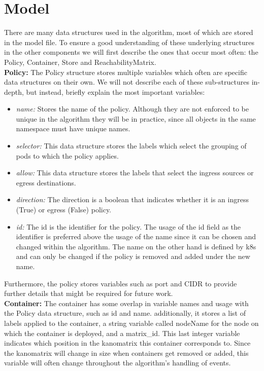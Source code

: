 \section{Model} \label{impl:model} There are many data structures used in the algorithm, most of which are stored in the model file. To ensure a good understanding of these underlying structures in the other components we will first describe the ones that occur most often: the Policy, Container, Store and ReachabilityMatrix.
\\[10pt]

\textbf{Policy:} The Policy structure stores multiple variables which often are specific data structures on their own. We will not describe each of these sub-structures in-depth, but instead, briefly explain the most important variables:
\begin{itemize}
    \renewcommand{\labelitemi}{\scriptsize$\blacksquare$}
    \item \textit{name:} Stores the name of the policy. Although they are not enforced to be unique in the algorithm they will be in practice, since all objects in the same namespace must have unique names. 
    \item \textit{selector:} This data structure stores the labels which select the grouping of pods to which the policy applies.
    \item \textit{allow:} This data structure stores the labels that select the ingress sources or egress destinations.
    \item \textit{direction:} The direction is a boolean that indicates whether it is an ingress (True) or egress (False) policy.
    \item \textit{id:} The id is the identifier for the policy. The usage of the id field as the identifier is preferred above the usage of the name since it can be chosen and changed within the algorithm. The name on the other hand is defined by \acrshort{k8s} and can only be changed if the policy is removed and added under the new name.
\end{itemize}
Furthermore, the policy stores variables such as port and CIDR to provide further details that might be required for future work.
\\[10pt]

\textbf{Container:} The container has some overlap in variable names and usage with the Policy data structure, such as id and name. additionally, it stores a list of labels applied to the container, a string variable called nodeName for the node on which the container is deployed, and a matrix\_id. This last integer variable indicates which position in the kanomatrix this container corresponds to. Since the kanomatrix will change in size when containers get removed or added, this variable will often change throughout the algorithm's handling of events.
\\[10pt]

